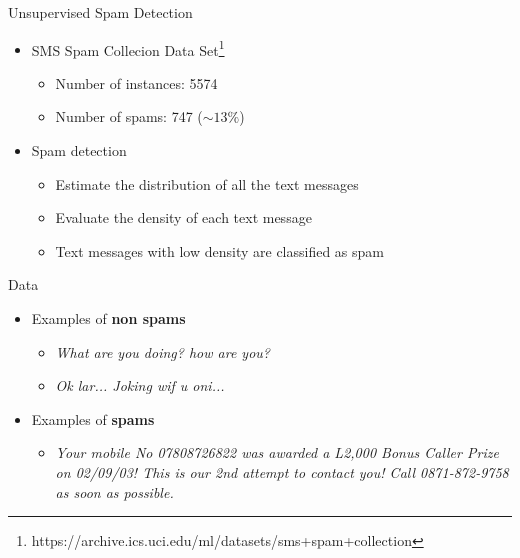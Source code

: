 \documentclass{beamer}
\begin{document}
\begin{frame}{Unsupervised Spam Detection}
\begin{itemize}
	\item SMS Spam Collecion Data Set\footnote{https://archive.ics.uci.edu/ml/datasets/sms+spam+collection}\begin{itemize}
		\item Number of instances: 5574
		\item Number of spams: 747 ($\sim 13 \%$)
	\end{itemize} 
	\item Spam detection
	\begin{itemize}
		\item Estimate the distribution of all the text messages
		\item Evaluate the density of each text message
		\item Text messages with low density are classified as spam
	\end{itemize}
\end{itemize}
\end{frame}

\begin{frame}{Data}
\begin{itemize}
	\item Examples of \textbf{non spams}
	\begin{itemize}
		\item \textit{What are you doing? how are you?}
		\item \textit{Ok lar... Joking wif u oni...}
	\end{itemize} 
	\item Examples of \textbf{spams}
	\begin{itemize}
		\item \textit{Your mobile No 07808726822 was awarded a L2,000 Bonus Caller Prize on 02/09/03! This is our 2nd attempt to contact you! Call 0871-872-9758 as soon as possible.}
	\end{itemize}
\end{itemize}
\end{frame}

\end{document}
